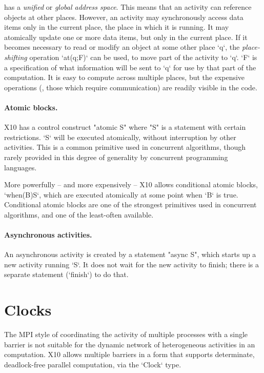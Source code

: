 {}\Xten{} has a \emph{unified} or \emph{global address space}. This means that
an activity can reference objects at other places. However, an activity may
synchronously access data items only in the current place, the place in which
it is running. It may atomically update one or more data items, but only in
the current place.   If it becomes necessary to read or modify an object at
some other place \xcd`q`, the {\em place-shifting} operation \xcd`at(q;F)` can
be used, to move part of the activity to \xcd`q`.  \xcd`F` is a specification
of what information will be sent to \xcd`q` for use by that part of the
computation. 
It is easy to compute
across multiple places, but the expensive operations (\eg, those which require
communication) are readily visible in the code. 

\paragraph{Atomic blocks.}

X10 has a control construct \xcd"atomic S" where \xcd"S" is a statement with
certain restrictions. \xcd`S` will be executed atomically, without
interruption by other activities. This is a common primitive used in
concurrent algorithms, though rarely provided in this degree of generality by
concurrent programming languages.

More powerfully -- and more expensively -- X10 allows conditional atomic
blocks, \xcd`when(B)S`, which are executed atomically at some point when
\xcd`B` is true.  Conditional atomic blocks are one of the strongest
primitives used in concurrent algorithms, and one of the least-often
available. 

\paragraph{Asynchronous activities.}

An asynchronous activity is created by a statement \xcd"async S", which starts
up a new activity running \xcd`S`.  It does not wait for the new activity to
finish; there is a separate statement (\xcd`finish`) to do that.




\section{Clocks}
The MPI style of coordinating the activity of multiple processes with
a single barrier is not suitable for the dynamic network of heterogeneous
activities in an \Xten{} computation.  
X10 allows multiple barriers in a form that supports determinate,
deadlock-free parallel computation, via the \xcd`Clock` type.

